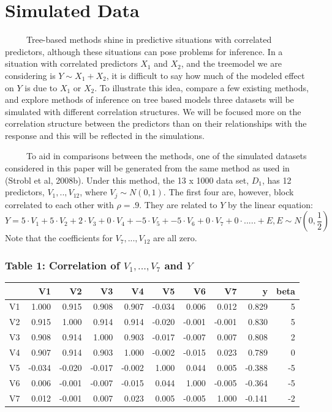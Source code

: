 \documentclass[12pt,twoside]{reedthesis}
\begin{document}
  \section{Simulated Data}\label{simulated-data}
  
  ~~~~~Tree-based methods shine in predictive situations with correlated
  predictors, although these situations can pose problems for inference.
  In a situation with correlated predictors \(X_1\) and \(X_2\), and the
  treemodel we are considering is \(Y \sim X_1 + X_2\), it is difficult to
  say how much of the modeled effect on \(Y\) is due to \(X_1\) or
  \(X_2\). To illustrate this idea, compare a few existing methods, and
  explore methods of inference on tree based models three datasets will be
  simulated with different correlation structures. We will be focused more
  on the correlation structure between the predictors than on their
  relationships with the response and this will be reflected in the
  simulations.
  
  ~~~~~To aid in comparisons between the methods, one of the simulated
  datasets considered in this paper will be generated from the same method
  as used in (Strobl et al, 2008b). Under this method, the 13 x 1000 data
  set, \(D_1\), has 12 predictors, \(V_1,..,V_{12}\), where
  \(V_j \sim N(0,1)\). The first four are, however, block correlated to
  each other with \(\rho = .9\). They are related to \(Y\) by the linear
  equation:
  \[Y = 5 \cdot V_1 + 5 \cdot V_2 + 2 \cdot V_3 + 0 \cdot V_4 + -5 \cdot V_5 + -5\cdot V_6 + 0\cdot V_7 + 0 \cdot ..... + E, E \sim N(0,\frac 1 2 )\]
  Note that the coefficients for \(V_7,...,V_{12}\) are all zero.
  
  \subsubsection{\texorpdfstring{Table 1: Correlation of \(V_1,..., V_7\)
  and
  \(Y\)}{Table 1: Correlation of V\_1,..., V\_7 and Y}}\label{table-1-correlation-of-v_1...-v_7-and-y}
  
  \begin{tabular}{l|r|r|r|r|r|r|r|r|r}
  \hline
    & V1 & V2 & V3 & V4 & V5 & V6 & V7 & y & beta\\
  \hline
  V1 & 1.000 & 0.915 & 0.908 & 0.907 & -0.034 & 0.006 & 0.012 & 0.829 & 5\\
  \hline
  V2 & 0.915 & 1.000 & 0.914 & 0.914 & -0.020 & -0.001 & -0.001 & 0.830 & 5\\
  \hline
  V3 & 0.908 & 0.914 & 1.000 & 0.903 & -0.017 & -0.007 & 0.007 & 0.808 & 2\\
  \hline
  V4 & 0.907 & 0.914 & 0.903 & 1.000 & -0.002 & -0.015 & 0.023 & 0.789 & 0\\
  \hline
  V5 & -0.034 & -0.020 & -0.017 & -0.002 & 1.000 & 0.044 & 0.005 & -0.388 & -5\\
  \hline
  V6 & 0.006 & -0.001 & -0.007 & -0.015 & 0.044 & 1.000 & -0.005 & -0.364 & -5\\
  \hline
  V7 & 0.012 & -0.001 & 0.007 & 0.023 & 0.005 & -0.005 & 1.000 & -0.141 & -2\\
  \hline
  \end{tabular}
  
\end{document}
